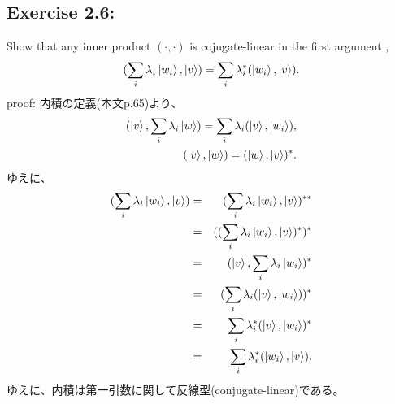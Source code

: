 \begin{flushleft}
\setcounter{equation}{0}
\section{\Large Exercise 2.6:} Show that any inner product $(\cdot, \cdot)$ is cojugate-linear in the first argument ,
\begin{equation}
(\sum_{i} \lambda_i \ket{w_i}, \ket{v}) = \sum_i \lambda_{i}^* (\ket{w_i}, \ket{v}).
\end{equation}
{\large proof:} 内積の定義(本文p.65)より、
\begin{eqnarray}
(\ket{v}, \sum_{i} \lambda_i \ket{w}) = \sum_{i} \lambda_i (\ket{v}, \ket{w_i}), \\ 
(\ket{v}, \ket{w}) = (\ket{w}, \ket{v})^*.
\end{eqnarray}
ゆえに、
\begin{eqnarray*}
(\sum_i \lambda_i \ket{w_i}, \ket{v}) &=&  (\sum_i \lambda_i \ket{w_i}, \ket{v})^{**} \\ 
&=&
((\sum_i \lambda_i \ket{w_i}, \ket{v})^*)^* \\
&=&(\ket{v}, \sum_i \lambda_i \ket{w_i})^*\\
&=&(\sum_i \lambda_i (\ket{v}, \ket{w_i}))^*\\
&=&\sum_i \lambda_{i}^* (\ket{v}, \ket{w_i})^*\\
&=&\sum_i \lambda_{i}^* (\ket{w_i}, \ket{v}).\\
\end{eqnarray*}
ゆえに、内積は第一引数に関して反線型(conjugate-linear)である。
\end{flushleft}

